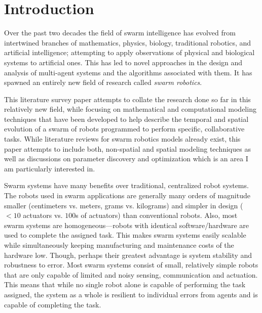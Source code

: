 \documentclass[Main.tex]{subfiles}
\begin{document}
\section{Introduction}
Over the past two decades the field of swarm intelligence has evolved from intertwined branches of mathematics, physics, biology, traditional robotics, and artificial intelligence; attempting to apply observations of physical and biological systems to artificial ones. This has led to novel approaches in the design and analysis of multi-agent systems and the algorithms associated with them. It has spawned an entirely new field of research called \emph{swarm robotics}\cite{Sahin2005}.

This literature survey paper attempts to collate the research done so far in this relatively new field, while focusing on mathematical and computational modeling techniques that have been developed to help describe the temporal and spatial evolution of a swarm of robots programmed to perform specific, collaborative tasks. While literature reviews for swarm robotics models already exist\cite{Winfield2005,Lerman2005}, this paper attempts to include both, non-spatial and spatial modeling techniques as well as discussions on parameter discovery and optimization which is an area I am particularly interested in.

Swarm systems have many benefits over traditional, centralized robot systems. The robots used in swarm applications are generally many orders of magnitude smaller (centimeters vs. meters, grams vs. kilograms) and simpler in design ($<10$ actuators vs. $100$s of actuators) than conventional robots. Also, most swarm systems are homogeneous---robots with identical software/hardware are used to complete the assigned task. This makes swarm systems easily scalable while simultaneously keeping manufacturing and maintenance costs of the hardware low. Though, perhaps their greatest advantage is system stability and robustness to error. Most swarm systems consist of small, relatively simple robots that are only capable of limited and noisy sensing, communication and actuation. This means that while no single robot alone is capable of performing the task assigned, the system as a whole is resilient to individual errors from agents and is capable of completing the task.
\end{document}
